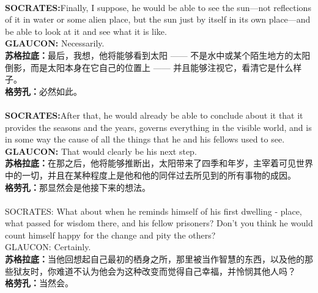 \documentclass{article}
\begin{document}
\\
\textbf{SOCRATES:}Finally, I suppose, he would be able to see the sun—not reflections of it in water or some alien place, but the sun just by itself in its own place—and be able to look at it and see what it is like.\\
\textbf{GLAUCON: }Necessarily.\\
\textbf{苏格拉底：}最后，我想，他将能够看到太阳 —— 不是水中或某个陌生地方的太阳倒影，而是太阳本身在它自己的位置上 —— 并且能够注视它，看清它是什么样子。\\
\textbf{格劳孔：}必然如此。\\

\\
\textbf{SOCRATES:}After that, he would already be able to conclude about it that it provides the seasons and the years, governs everything in the visible world, and is in some way the cause of all the things that he and his fellows used to see.\\
\textbf{GLAUCON: }That would clearly be his next step.\\
\textbf{苏格拉底：}在那之后，他将能够推断出，太阳带来了四季和年岁，主宰着可见世界中的一切，并且在某种程度上是他和他的同伴过去所见到的所有事物的成因。\\
\textbf{格劳孔：}那显然会是他接下来的想法。\\

\\
SOCRATES: What about when he reminds himself of his first dwelling - place, what passed for wisdom there, and his fellow prisoners? Don't you think he would count himself happy for the change and pity the others?\\
GLAUCON: Certainly.\\
\textbf{苏格拉底：}当他回想起自己最初的栖身之所，那里被当作智慧的东西，以及他的那些狱友时，你难道不认为他会为这种改变而觉得自己幸福，并怜悯其他人吗？\\
\textbf{格劳孔：}当然会。\\
\end{document}
